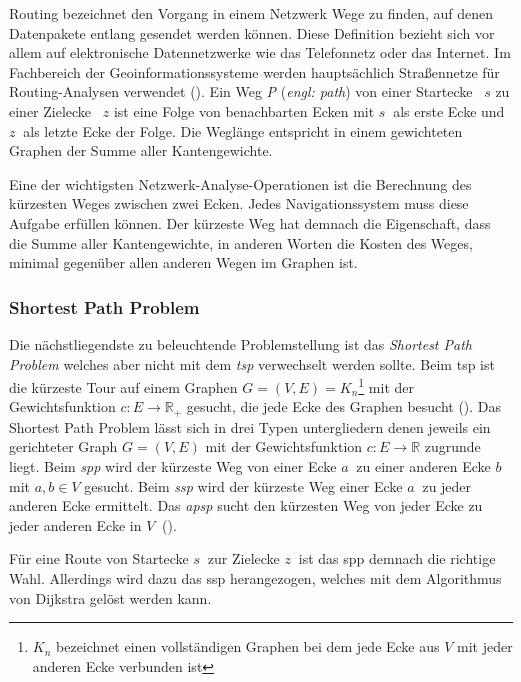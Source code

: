 Routing bezeichnet den Vorgang in einem Netzwerk Wege zu finden, auf denen Datenpakete entlang gesendet werden können.
Diese Definition bezieht sich vor allem auf elektronische Datennetzwerke wie das Telefonnetz oder das Internet.
Im Fachbereich der Geoinformationssysteme werden hauptsächlich Straßennetze für Routing-Analysen verwendet (\cite[165]{handbook}).
Ein Weg \textit{P} (\textit{engl: path}) von einer Startecke ~$s$ zu einer Zielecke ~$z$ ist eine Folge von benachbarten Ecken mit $s~$ als erste Ecke und $z~$ als letzte Ecke der Folge.
Die Weglänge entspricht in einem gewichteten Graphen der Summe aller Kantengewichte.

Eine der wichtigsten Netzwerk-Analyse-Operationen ist die Berechnung des kürzesten Weges zwischen zwei Ecken.
Jedes Navigationssystem muss diese Aufgabe erfüllen können.
Der kürzeste Weg hat demnach die Eigenschaft, dass die Summe aller Kantengewichte, in anderen Worten die Kosten des Weges, minimal gegenüber allen anderen Wegen im Graphen ist.

\subsubsection{Shortest Path Problem}
Die nächstliegendste zu beleuchtende Problemstellung ist das \textit{Shortest Path Problem} welches aber nicht mit dem \textit{\gls{tsp}} verwechselt werden sollte.
Beim \gls{tsp} ist die kürzeste Tour auf einem Graphen $G = (V,E) = K_{n}$\footnote{$K_{n}$ bezeichnet einen vollständigen Graphen bei dem jede Ecke aus $V$ mit jeder anderen Ecke verbunden ist} mit der Gewichtsfunktion $c: E \rightarrow \mathbb{R}_{+}$ gesucht, die jede Ecke des Graphen besucht (\cite[135]{algorithms}).
Das Shortest Path Problem lässt sich in drei Typen untergliedern denen jeweils ein gerichteter Graph $G = (V,E)$ mit der Gewichtsfunktion $c: E \rightarrow \mathbb{R}$ zugrunde liegt.
Beim \textit{\gls{spp}} wird der kürzeste Weg von einer Ecke $a~$ zu einer anderen Ecke $b~$ mit $a,b\in V$ gesucht.
Beim \textit{\gls{ssp}} wird der kürzeste Weg einer Ecke $a~$ zu jeder anderen Ecke ermittelt.
Das \textit{\gls{apsp}} sucht den kürzesten Weg von jeder Ecke zu jeder anderen Ecke in $V~$ (\cite[169\psq]{algorithms}).

Für eine Route von Startecke $s~$ zur Zielecke $z~$ ist das \gls{spp} demnach die richtige Wahl.
Allerdings wird dazu das \gls{ssp} herangezogen, welches mit dem Algorithmus von Dijkstra gelöst werden kann.



